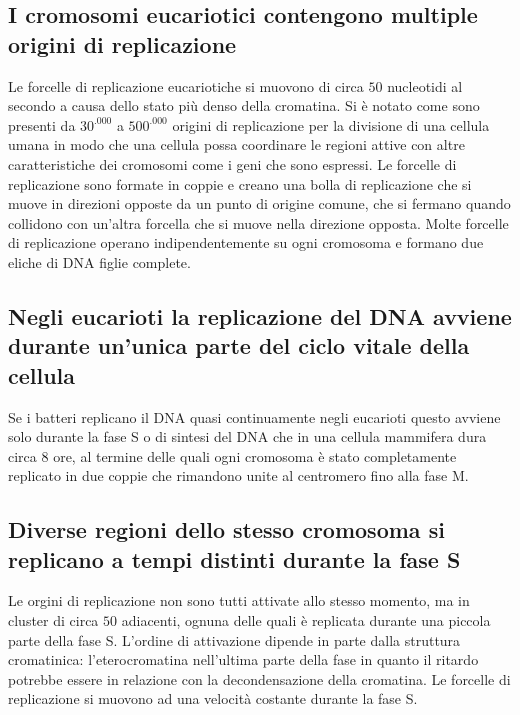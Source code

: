 \subsection{I cromosomi eucariotici contengono multiple origini di replicazione}
Le forcelle di replicazione eucariotiche si muovono di circa $50$ nucleotidi al secondo a causa dello stato pi\`u denso della cromatina. Si \`e notato come sono presenti da $30^.000$ a 
$500^.000$ origini di replicazione per la divisione di una cellula umana in modo che una cellula possa coordinare le regioni attive con altre caratteristiche dei cromosomi come i geni
che sono espressi. Le forcelle di replicazione sono formate in coppie e creano una bolla di replicazione che si muove in  direzioni opposte da un punto di origine comune, che si
fermano quando collidono con un'altra forcella che si muove nella direzione opposta. Molte forcelle di replicazione operano indipendentemente su ogni cromosoma e formano due eliche di 
DNA figlie complete. 
\subsection{Negli eucarioti la replicazione del DNA avviene durante un'unica parte del ciclo vitale della cellula}
Se i batteri replicano il DNA quasi continuamente negli eucarioti questo avviene solo durante la fase S o di sintesi del DNA che in una cellula mammifera dura circa $8$ ore, al termine
delle quali ogni cromosoma \`e stato completamente replicato in due coppie che rimandono unite al centromero fino alla fase M. 
\subsection{Diverse regioni dello stesso cromosoma si replicano a tempi distinti durante la fase S}
Le orgini di replicazione non sono tutti attivate allo stesso momento, ma in cluster di circa $50$ adiacenti, ognuna delle quali \`e replicata durante una piccola parte della fase S.
L'ordine di attivazione dipende in parte dalla struttura cromatinica: l'eterocromatina nell'ultima parte della fase in quanto il ritardo potrebbe essere in relazione con la 
decondensazione della cromatina. Le forcelle di replicazione si muovono ad una velocit\`a costante durante la fase S.
